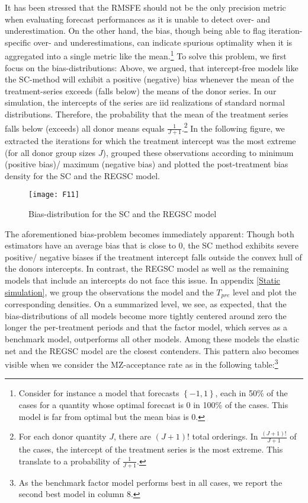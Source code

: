 It has been stressed that the \ac{RMSFE} should not be the only precision metric when evaluating  forecast performances as it is unable to detect over- and underestimation. On the other hand, the bias, though being able to flag iteration-specific over- and underestimations, can indicate spurious optimality when it is aggregated into a single metric like the mean.\footnote{Consider for instance a model that forecasts $\left\lbrace -1,1\right\rbrace $, each in 50\% of the cases for a quantity whose optimal forecast is 0 in 100\% of the cases. This model is far from optimal but the mean bias is 0.} To solve this problem, we first focus on the bias-distributions: Above, we argued, that intercept-free models like the \ac{SC}-method will exhibit a positive (negative) bias whenever the mean of the treatment-series exceeds (falls below) the means of the donor series. In our simulation, the intercepts of the series are \ac{iid} realizations of standard normal distributions. Therefore, the probability that the mean of the treatment series falls below (exceeds) all donor means equals $\frac{1}{J+1}$.\footnote{For each donor quantity $J$, there are $(J+1)!$ total orderings. In $\frac{(J+1)!}{J+1}$ of the cases, the intercept of the treatment series is the most extreme. This translate to a probability of $\frac{1}{J+1}$. } In the following figure, we extracted the iterations for which the treatment intercept was the most extreme (for all donor group sizes $J$), grouped these observations according to minimum (positive bias)/ maximum (negative bias) and plotted the post-treatment bias density for the \ac{SC} and the \ac{REGSC} model. 
\begin{figure}[H]
	\centering
	\texttt{[image: F11]}
	\caption{Bias-distribution for the SC and the REGSC model}
	\label{F_09}
\end{figure}

The aforementioned bias-problem becomes immediately apparent: Though both estimators have an average bias that is close to 0, the \ac{SC} method exhibits severe positive/ negative biases if the treatment intercept falls outside the convex hull of the donors intercepts. In contrast, the \ac{REGSC} model as well as the remaining models that include an intercepts do not face this issue. In appendix \ref{Static simulation}, we group the observations the model and the $T_{pre}$ level and plot the corresponding densities. On a summarized level, we see, as expected, that the bias-distributions of all models become more tightly centered around zero the longer the per-treatment periods and that the factor model, which serves as a benchmark model, outperforms all other models. Among these models the elastic net and the \ac{REGSC} model are the closest contenders. This pattern also becomes visible when we consider the \ac{MZ}-acceptance rate as in the following table:\footnote{As the benchmark factor model performs best in all cases, we report the second best model in column 8.}


